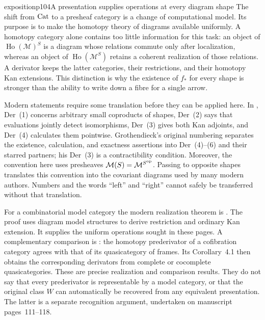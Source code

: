 \begin{dcomment}{exposition}{p104}{A presentation supplies operations at every diagram shape}
The shift from $\mathrm{Cat}$ to a presheaf category is a change of computational model. Its purpose is to make the homotopy theory of diagrams available uniformly. A homotopy category alone contains too little information for this task: an object of $\operatorname{Ho}(\mathcal M)^S$ is a diagram whose relations commute only after localization, whereas an object of $\operatorname{Ho}(\mathcal M^S)$ retains a coherent realization of those relations. A derivator keeps the latter categories, their restrictions, and their homotopy Kan extensions. This distinction is why the existence of $f_*$ for every shape is stronger than the ability to write down a fibre for a single arrow.

Modern statements require some translation before they can be applied here. In \citet[Definition~1.5]{Groth2013}, Der~(1) concerns arbitrary small coproducts of shapes, Der~(2) says that evaluations jointly detect isomorphisms, Der~(3) gives both Kan adjoints, and Der~(4) calculates them pointwise. Grothendieck's original numbering separates the existence, calculation, and exactness assertions into Der~(4)--(6) and their starred partners; his Der~(3) is a contractibility condition. Moreover, the convention here uses presheaves $\mathcal M(S)=\mathcal M^{S^{\rm op}}$. Passing to opposite shapes translates this convention into the covariant diagrams used by many modern authors. Numbers and the words ``left'' and ``right'' cannot safely be transferred without that translation.

For a combinatorial model category the modern realization theorem is \citet[Proposition~1.30]{Groth2013}. The proof uses diagram model structures to derive restriction and ordinary Kan extension. It supplies the uniform operations sought in these pages. A complementary comparison is \citet[Theorem~3.33]{Lenz2018}: the homotopy prederivator of a cofibration category agrees with that of its quasicategory of frames. Its Corollary~4.1 then obtains the corresponding derivators from complete or cocomplete quasicategories. These are precise realization and comparison results. They do not say that every prederivator is representable by a model category, or that the original class $W$ can automatically be recovered from any equivalent presentation. The latter is a separate recognition argument, undertaken on manuscript pages~111--118.
\end{dcomment}


